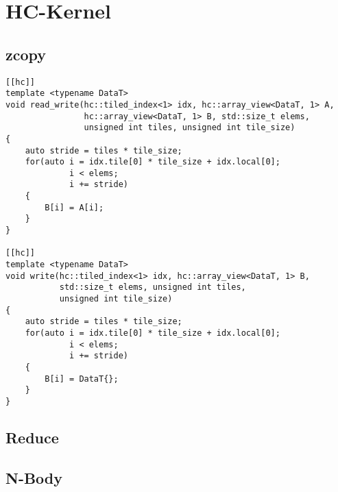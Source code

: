 \section{HC-Kernel}

\subsection{zcopy}

\begin{code}
    \begin{verbatim}
[[hc]]
template <typename DataT>
void read_write(hc::tiled_index<1> idx, hc::array_view<DataT, 1> A,
                hc::array_view<DataT, 1> B, std::size_t elems,
                unsigned int tiles, unsigned int tile_size)
{
    auto stride = tiles * tile_size;
    for(auto i = idx.tile[0] * tile_size + idx.local[0];
             i < elems;
             i += stride)
    {
        B[i] = A[i];
    }
}

[[hc]]
template <typename DataT>
void write(hc::tiled_index<1> idx, hc::array_view<DataT, 1> B,
           std::size_t elems, unsigned int tiles,
           unsigned int tile_size)
{
    auto stride = tiles * tile_size;
    for(auto i = idx.tile[0] * tile_size + idx.local[0];
             i < elems;
             i += stride)
    {
        B[i] = DataT{};
    }
}
    \end{verbatim}
    \caption{zcopy - HC-Implementierung}
    \label{anhang:hc:zcopy}
\end{code}

\subsection{Reduce}
\subsection{N-Body}

